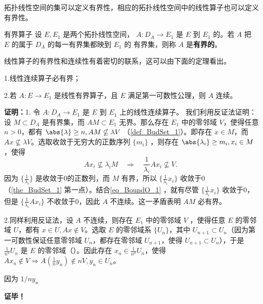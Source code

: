 
\begin{issues}
\issueDraft
\end{issues}

拓扑线性空间的集可以定义有界性，相应的拓扑线性空间中的线性算子也可以定义有界性。

\begin{definition}{有界算子}
设 $E,E_1$ 是两个拓扑线性空间， $A:D_A\rightarrow E_1$ 是 $E$ 到 $E_1$ 的。若 $A$ 把 $E$ 的属于 $D_A$ 的每一有界集都映到 $E_1$ 的 有界集，则称 $A$ 是\textbf{有界的}。
\end{definition}

线性算子的有界性和连续性有着密切的联系，这可以由下面的定理看出。

\begin{theorem}{}
1.线性连续算子必有界；

2.若 $A:E\rightarrow E_1$ 是线性有界算子，且 $E$ 满足第一可数性公理，则 $A$ 连续。
\end{theorem}
\textbf{证明：}1. 令 $A:D_A\rightarrow E_1$ 是 $E$ 到 $E_1$ 上的线性连续算子。 我们利用反证法证明：设 $M\subset D_A$ 是有界集，而 $AM\subset E_1$ 无界。那么存在 $E_1$ 中的零邻域 $V$，使得任意 $n>0$，都有 $\abs{\lambda}\geq n,AM\nsubseteq\lambda V$ （\autoref{def_BudSet_1}）。即存在 $x\in M$，而 $Ax\nsubseteq \lambda V$。选取收敛于无穷大的正数序列 $\{m_i\}$ ，则存在 $\abs{\lambda_i}\geq m_i,x_i\in M$，使得 
\begin{equation}\label{eq_BoundO_1}
Ax_i\nsubseteq \lambda_iM\quad\Rightarrow\quad \frac{1}{\lambda_i}A x_i\nsubseteq V. ~
\end{equation}
因为 $\{\frac{1}{\lambda_i}\}$ 是收敛于0的正数列，而 $M$ 有界，所以 $\{\frac{1}{\lambda_i}x_i\}$ 收敛于0（\autoref{the_BudSet_1} 第一点）。结合\autoref{eq_BoundO_1} ，就有尽管 $\{\frac{1}{\lambda_i}x_i\}$ 收敛于0，但是 $\{\frac{1}{\lambda_i}A x_i\}$ 不收敛于0，因此 $A$ 不连续。这一矛盾表明 $AM$ 必有界。

2.同样利用反证法，设 $A$ 不连续，则存在 $E_1$ 中的零邻域 $V$ ，使得任意 $E$ 的零邻域 $U$，都有 $x\in U,Ax\notin V$。选取 $E$ 的零邻域系 $\{U_n\}$，其中 $U_{n+1}\subset U_n$（因为第一可数性保证任意零邻域 $U_n$，都存在零邻域 $U_{n+1}$，使得 $U_{n+1}\subset U_n$），于是 $\frac{1}{n^2} U_n$ 是 $E$ 的零邻域（）。因此存在 $x_n\in \frac{1}{n^2}U_n$，使得 $Ax_n\notin V\Rightarrow A (\frac{1}{n}y_n)\notin n V,y_n\in U_n$。

因为 $1/n y_n$ 
 
\textbf{证毕！}


